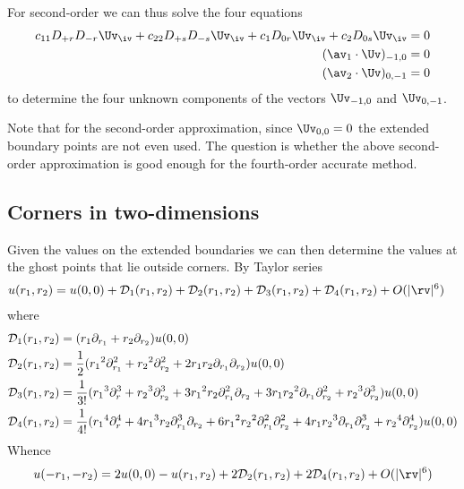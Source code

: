 For second-order we can thus solve the four equations 
\begin{align*}
  c_{11} D_{+r}D_{-r} \Uv_\iv + c_{22} D_{+s}D_{-s} \Uv_\iv + c_{1} D_{0r} \Uv_\iv + c_{2} D_{0s} \Uv_\iv &= 0 \\
  (\av_1\cdot\Uv)_{-1,0} &= 0 \\
  (\av_2\cdot\Uv)_{0,-1} &= 0 
\end{align*}
to determine the four unknown components of the vectors $\Uv_{-1,0}$ and $\Uv_{0,-1}$.

Note that for the second-order approximation, since $\Uv_{0,0}=0$ the extended boundary points are
not even used. The question is whether the above second-order approximation is good enough
for the fourth-order accurate method.

\clearpage
\subsection{Corners in two-dimensions}


Given the values on the extended boundaries we can then determine the 
values at the ghost points that lie outside corners.
\newcommand{\trunc}{O(|\rv|^6)}%
\newcommand{\truncb}{O(|\rv|^4)}%
\newcommand{\trunca}{O(|\rv|^2)}%
By Taylor series
\begin{align*}
  u(\ra,\rb)&= u(0,0) + \Ds_1(\ra,\rb) + \Ds_2(\ra,\rb) + \Ds_3(\ra,\rb) + \Ds_4(\ra,\rb) + \trunc
\end{align*}
where
\begin{align*}
  {\mathcal D}_1({r_1},{r_2}) &= ({r_1} \partial_{r_1} + {r_2} \partial_{r_2} ) u(0,0) \\
  {\mathcal D}_2({r_1},{r_2}) &= {1\over2}( {r_1}^2\partial_{r_1}^2+{r_2}^2\partial_{r_2}^2+ 2{r_1}{r_2}\partial_{r_1}\partial_{r_2}  )u(0,0)  \\
  {\mathcal D}_3({r_1},{r_2}) &= {1\over3!}( {r_1}^3\partial_r^3 + {r_2}^3\partial_{r_2}^3 
                   +3{r_1}^2{r_2}\partial_{r_1}^2\partial_{r_2} 
                   + 3{r_1}{r_2}^2\partial_{r_1}\partial_{r_2}^2 
                   + {r_2}^3\partial_{r_2}^3  )u(0,0)                    \\
  {\mathcal D}_4({r_1},{r_2}) &= {1\over4!}( {r_1}^4\partial_r^4
                   +4{r_1}^3{r_2}\partial_{r_1}^3\partial_{r_2} 
                   +6{r_1}^2{r_2}^2\partial_{r_1}^2\partial_{r_2}^2 
                   +4{r_1}{r_2}^3\partial_{r_1}\partial_{r_2}^3 
                   + {r_2}^4\partial_{r_2}^4   )u(0,0)  
\end{align*}
Whence
\begin{align}
 u(-\ra,-\rb) &= 2 u(0,0) - u(\ra,\rb) + 2\Ds_2(\ra,\rb) + 2\Ds_4(\ra,\rb)+ \trunc \label{taylor1} \\
\end{align}


